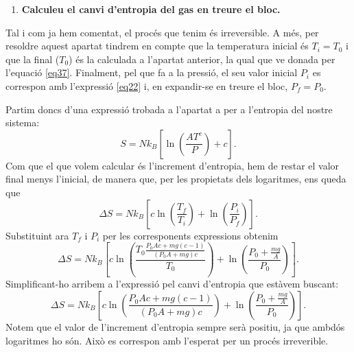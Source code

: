 \documentclass[a4paper, 10pt]{article}
\begin{document}
\begin{enumerate}[leftmargin=0pt,label=\arabic*.,labelsep=0.5em,before=\setlength{\parindent}{0pt}]
	Per determinar la temperatura final, substituïm l'expressió trobada de $h_f$ \eqref{eqhf} en l’expressió anterior de $T$ \eqref{eqT}
	\begin{equation}
		T 
		= 
		\frac{P_0 A}{nR} h 
		\left( 1 + \frac{mg(c-1)}{P_0 A c} \right)
		=
		\frac{h}{nRC}
		\left( P_0 A c + mg(c-1) \right)
	\end{equation}
	Ara tornem a substituir el nombre de mols \eqref{eqn}
	\begin{equation}
		T 
		= 
		\frac{h R T_0}{Rc (P_0 + \frac{mg}{A})hA}
		\left( P_0 A c + mg(c-1) \right)
		=
		T_0
		\frac{P_0 A c + mg(c-1)}{c(P_0 A + mg)}
	\end{equation}
	Finalment, simplificant l’expressió, s’obté
	\begin{equation}
		\boxed{T = T_0 \left( 1 - \frac{mg}{c(P_0 A + mg)} \right)}.
	\label{eq37}
	\end{equation}
	En aquesta expressió podem veure que $T < T_0$. És coherent ja que, en expandir-se el gas sense transferència de calor, la seva energia interna es reparteix sobre un volum major, fet que fa que la temperatura final sigui menor que la inicial.
	
	\item \textbf{Calculeu el canvi d'entropia del gas en treure el bloc.}
\end{enumerate}
Tal i com ja hem comentat, el procés que tenim és irreversible. A més, per resoldre aquest apartat tindrem en compte que la temperatura inicial és $T_i=T_0$ i que la final ($T_0$) és la calculada a l'apartat anterior, la qual que ve donada per l'equació \eqref{eq37}. Finalment, pel que fa a la pressió, el seu valor inicial $P_i$ es correspon amb l'expressió \eqref{eq22} i, en expandir-se en treure el bloc, $P_f=P_0$.

Partim doncs d'una expressió trobada a l'apartat a per a l'entropia del nostre sistema:
\begin{equation}
	S = Nk_B\left[\ln(\frac{AT^{c}}{P})+c\right].
\end{equation} 
Com que el que volem calcular és l'increment d'entropia, hem de restar el valor final menys l'inicial, de manera que, per les propietats dels logaritmes, ens queda que
\begin{equation*}
	\Delta S = Nk_B\left[c\ln(\frac{T_f}{T_i})+\ln(\frac{P_i}{P_f})\right].
\end{equation*}
Substituint ara $T_f$ i $P_i$ per les corresponents expressions obtenim
\begin{equation*}
	\Delta S = Nk_B\left[c\ln(\frac{T_0\frac{P_0 Ac+mg(c-1)}{(P_0A+mg)c}}{T_0})+\ln(\frac{P_0+\frac{mg}{A}}{P_0})\right].
\end{equation*}
Simplificant-ho arribem a l'expressió pel canvi d'entropia que estàvem buscant:
\begin{equation}
	\boxed{\Delta S = Nk_B\left[c\ln(\frac{P_0 Ac+mg(c-1)}{(P_0A+mg)c})+\ln(\frac{P_0+\frac{mg}{A}}{P_0})\right]}.
\end{equation}
Notem que el valor de l'increment d'entropia sempre serà positiu, ja que ambdós logaritmes ho són. Això es correspon amb l'esperat per un procés irreverible.
\end{document}
